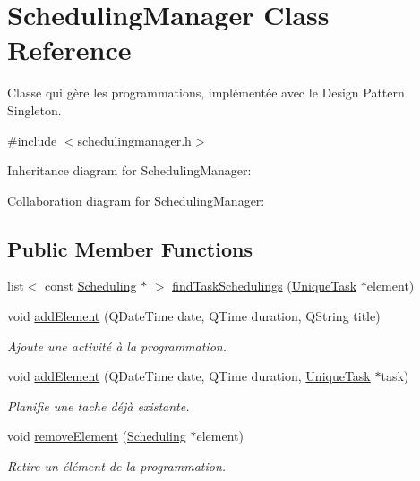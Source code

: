 \hypertarget{class_scheduling_manager}{}\section{Scheduling\+Manager Class Reference}
\label{class_scheduling_manager}


Classe qui gère les programmations, implémentée avec le Design Pattern Singleton.  




{\ttfamily \#include $<$schedulingmanager.\+h$>$}



Inheritance diagram for Scheduling\+Manager\+:


Collaboration diagram for Scheduling\+Manager\+:
\subsection*{Public Member Functions}
\begin{DoxyCompactItemize}
\item 
list$<$ const \hyperlink{class_scheduling}{Scheduling} $\ast$ $>$ \hyperlink{class_scheduling_manager_a84c5f7f09108fe303942333152d7f591}{find\+Task\+Schedulings} (\hyperlink{class_unique_task}{Unique\+Task} $\ast$element)
\item 
void \hyperlink{class_scheduling_manager_a5d25071597027e83aa1f83e918f2043a}{add\+Element} (Q\+Date\+Time date, Q\+Time duration, Q\+String title)
\begin{DoxyCompactList}\small\item\em Ajoute une activité à la programmation. \end{DoxyCompactList}\item 
void \hyperlink{class_scheduling_manager_a995d7f8e5ede94b26609f027ae11f589}{add\+Element} (Q\+Date\+Time date, Q\+Time duration, \hyperlink{class_unique_task}{Unique\+Task} $\ast$task)
\begin{DoxyCompactList}\small\item\em Planifie une tache déjà existante. \end{DoxyCompactList}\item 
void \hyperlink{class_scheduling_manager_ac18b6f093b29479046df357bb8b6c220}{remove\+Element} (\hyperlink{class_scheduling}{Scheduling} $\ast$element)
\begin{DoxyCompactList}\small\item\em Retire un élément de la programmation. \end{DoxyCompactList}\end{DoxyCompactItemize}
